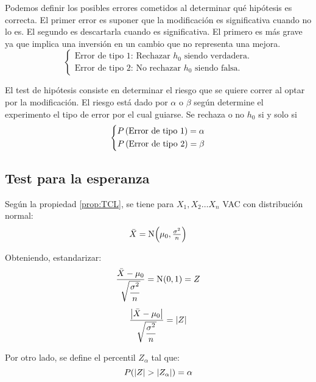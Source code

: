Podemos definir los posibles errores cometidos al determinar qué hipótesis es correcta.
El primer error es suponer que la modificación es significativa cuando no lo es.
El segundo es descartarla cuando es significativa.
El primero es más grave ya que implica una inversión en un cambio que no representa una mejora.
\begin{equation*}
    \left\{
    \begin{aligned}
        \text{Error de tipo 1: Rechazar $h_0$ siendo verdadera.}
        \\
        \text{Error de tipo 2: No rechazar $h_0$ siendo falsa.}
    \end{aligned}
    \right.
\end{equation*}

El test de hipótesis consiste en determinar el riesgo que se quiere correr al optar por la modificación.
El riesgo está dado por $\alpha$ o $\beta$ según determine el experimento el tipo de error por el cual guiarse.
Se rechaza o no $h_0$ si y solo si
\begin{equation*}
    \left\{
    \begin{aligned}
        P \inParentheses{\text{Error de tipo 1}} = \alpha
        \\
        P \inParentheses{\text{Error de tipo 2}} = \beta
    \end{aligned}
    \right.
\end{equation*}


\subsection{Test para la esperanza}

Según la propiedad \ref{prop:TCL}, se tiene para $X_1, X_2 \dots X_n$ VAC con distribución normal:
\begin{equation*}
    \ave{X} = \fx[\nor]{\mu_0, \tfrac{\sigma^2}{n}}
\end{equation*}

Obteniendo, estandarizar:
\begin{gather*}
    \frac{\ave{X}-\mu_0}{\sqrt{\dfrac{\sigma^2}{n}}} = \fx[\nor]{0,1} = Z
    \\[1ex]
    \frac{\norm{\ave{X}-\mu_0}}{\sqrt{\dfrac{\sigma^2}{n}}} = \norm{Z}
\end{gather*}

Por otro lado, se define el percentil $Z_\alpha$ tal que:
\begin{equation*}
    P(\norm{Z}>\norm{Z_\alpha}) = \alpha
\end{equation*}

